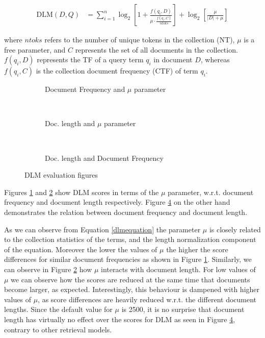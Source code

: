 \begin{small}
\begin{align}
\label{dlmformula}
    \text{DLM}(D,Q) &= \sum_{i=1}^{n} \log_2 \left[ 1 + \frac{f(q_i, D)}{\mu \cdot \frac{ f(q_i, C) }{ ntoks }}\right] + \log_2 \left[\frac{\mu}{|D| + \mu}\right]
\end{align}
\label{dlmequation}
\end{small}

\noindent where $ntoks$ refers to the number of unique tokens in the collection (NT), $\mu$ is a free parameter, and $C$ represents the set of all documents in the collection. $f(q_i, D)$ represents the TF of a query term $q_i$ in document $D$, whereas $f(q_i, C)$ is the collection document frequency (CTF) of term $q_i$.

\begin{figure}
 		\begin{subfigure}[]{0.5\textwidth}
     	\caption{Document Frequency and $\mu$ parameter} 
    	
     	\label{dlmproofc2}
        \end{subfigure}
        ~
		\begin{subfigure}[]{0.5\textwidth}
           \caption{Doc. length and $\mu$ parameter}
           
           \label{dlmproofcc}          
        \end{subfigure}
        ~
		\begin{subfigure}[]{0.5\textwidth}
          \caption{Doc. length and Document Frequency}
          
          \label{dlmproof}          
        \end{subfigure}

        \caption{DLM evaluation figures}
\end{figure}

Figures \ref{dlmproofc2} and \ref{dlmproofcc} show DLM scores in terms of the $\mu$ parameter, w.r.t. document frequency and document length respectively. Figure \ref{dlmproof} on the other hand demonstrates the relation between document frequency and document length.

As we can observe from Equation \ref{dlmequation} the parameter $\mu$ is closely related to the collection statistics of the terms, and the length normalization component of the equation. Moreover the lower the values of $\mu$ the higher the score differences for similar document frequencies as shown in Figure \ref{dlmproofc2}. Similarly, we can observe in Figure \ref{dlmproofcc} how $\mu$ interacts with document length. For low values of $\mu$ we can observe how the scores are reduced at the same time that documents become larger, as expected. Interestingly, this behaviour is dampened with higher values of $\mu$, as score differences are heavily reduced w.r.t. the different document lengths. Since the default value for $\mu$ is 2500, it is no surprise that document length has virtually no effect over the scores for DLM  as seen in Figure \ref{dlmproof}, contrary to other retrieval models. 

